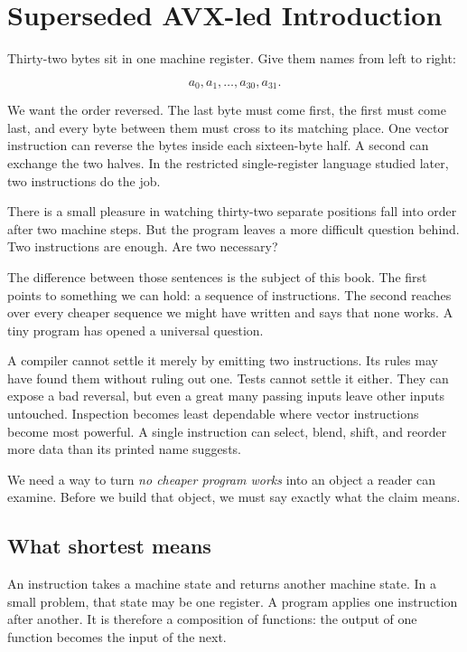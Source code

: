 \chapter{Superseded AVX-led Introduction}
\label{ch:introduction}

Thirty-two bytes sit in one machine register. Give them names from left to
right:

\[
a_0,a_1,\ldots,a_{30},a_{31}.
\]

We want the order reversed. The last byte must come first, the first must come
last, and every byte between them must cross to its matching place. One vector
instruction can reverse the bytes inside each sixteen-byte half. A second can
exchange the two halves. In the restricted single-register language studied
later, two instructions do the job.

There is a small pleasure in watching thirty-two separate positions fall into
order after two machine steps. But the program leaves a more difficult
question behind. Two instructions are enough. Are two necessary?

The difference between those sentences is the subject of this book. The
first points to something we can hold: a sequence of instructions. The second
reaches over every cheaper sequence we might have written and says that none
works. A tiny program has opened a universal question.

A compiler cannot settle it merely by emitting two instructions. Its rules
may have found them without ruling out one. Tests cannot settle it either.
They can expose a bad reversal, but even a great many passing inputs leave
other inputs untouched. Inspection becomes least dependable where vector
instructions become most powerful. A single instruction can select, blend,
shift, and reorder more data than its printed name suggests.

We need a way to turn \emph{no cheaper program works} into an object a reader
can examine. Before we build that object, we must say exactly what the claim
means.

\section{What shortest means}
\label{sec:intro-shortest}

An instruction takes a machine state and returns another machine state. In a
small problem, that state may be one register. A program applies one
instruction after another. It is therefore a composition of functions: the
output of one function becomes the input of the next.

